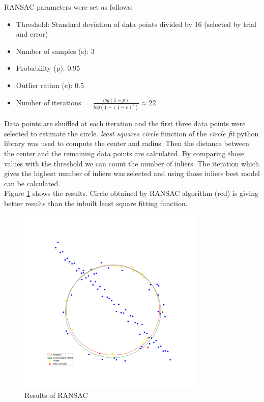 \documentclass[11pt]{article}
\begin{document}
\noindent RANSAC parameters were set as follows:
\begin{itemize}
    \item Threshold: Standard deviation of data points divided by 16 (selected by trial and error)
    \item Number of samples (s): 3
    \item Probability (p): 0.95
    \item Outlier ration (e): 0.5
    \item Number of iterations $ = \frac{log(1-p)}{log(1-(1-e)^s)} \approx 22 $
\end{itemize}

\noindent Data points are shuffled at each iteration and the first three data points were selected to estimate the circle. \textit{least squares circle} 
function of the \textit{circle fit} python library was used to compute the center and radius. Then the distance between the center and the remaining 
data points are calculated. By comparing those values with the threshold we can count the number of inliers. The iteration which gives the highest
number of inliers was selected and using those inliers best model can be calculated. \\

\noindent Figure \ref{RANSAC} shows the results. Circle obtained by RANSAC algorithm (red) is giving better 
results than the inbuilt least square fitting function. 

\begin{figure}[!h]
    \centering
    \includegraphics[width=0.8\textwidth]{Images/1.png}
    \caption{Results of RANSAC}
    \label{RANSAC}
\end{figure}


%
%
\end{document}
